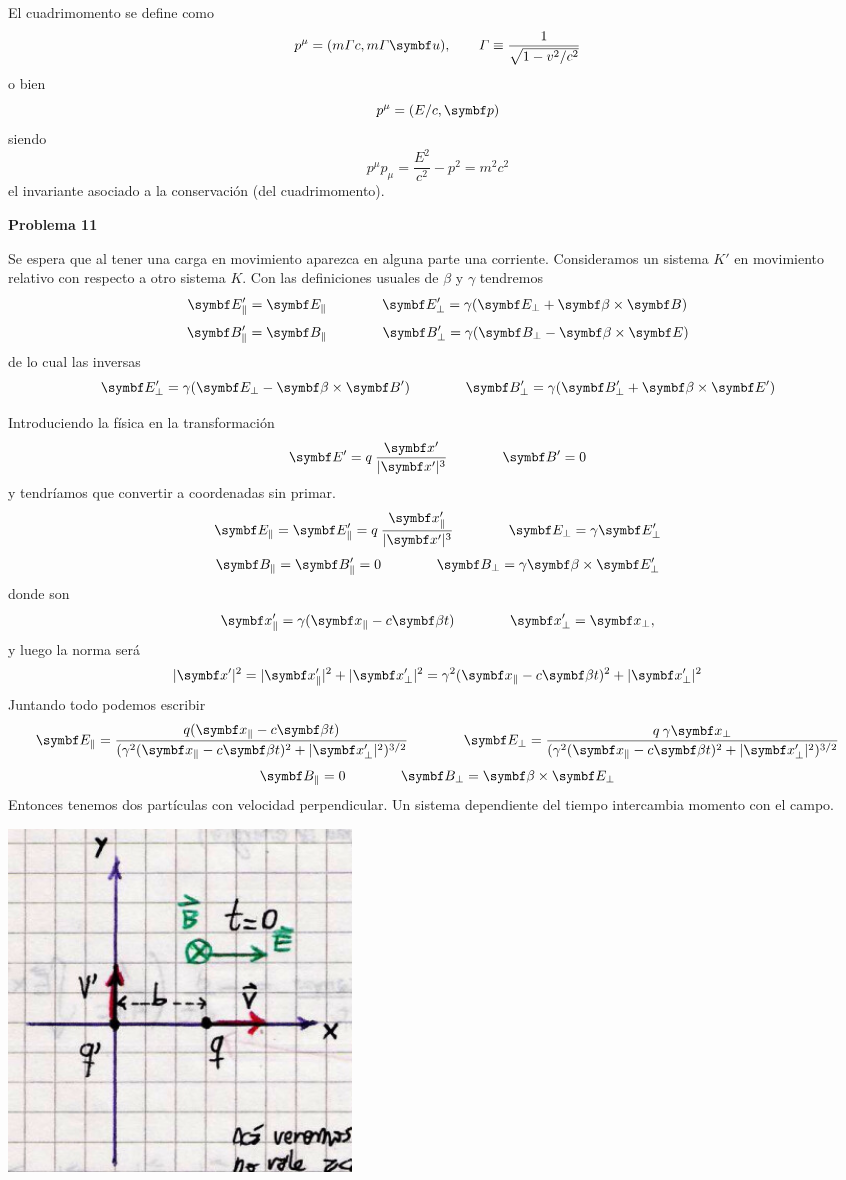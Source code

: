 \documentclass[10pt,oneside]{CBFT_book}
\begin{document}
El cuadrimomento se define como 
\[
	p^\mu = ( m\Gamma c , m \Gamma \vb {u}), \qquad \Gamma \equiv \frac{ 1 }{ \sqrt{ 1 - v^2/c^2 } } 
\]
o bien 
\[
	p^\mu = ( E/c , \vb{p} )
\]
siendo 
\[
	p^\mu p_\mu = \frac{E^2}{c^2} - p^2 = m^2 c^2
\]
el invariante asociado a la conservación (del cuadrimomento).

\begin{ejemplo}{\bf Problema 11}
 
Se espera que al tener una carga en movimiento aparezca en alguna parte una corriente.
Consideramos un sistema $K'$ en movimiento relativo con respecto a otro sistema $K$.
Con las definiciones usuales de $\beta$ y $\gamma$ tendremos
\[
	\vb{E}_\parallel' = \vb{E}_\parallel \qquad \qquad  
	\vb{E}_\perp' = \gamma ( \vb{E}_\perp + \pv{\beta}{B} )
\]
\[
	\vb{B}_\parallel' = \vb{B}_\parallel \qquad \qquad  
	\vb{B}_\perp' = \gamma ( \vb{B}_\perp - \pv{\beta}{E} )
\]
de lo cual las inversas
\[
	\vb{E}_\perp' = \gamma ( \vb{E}_\perp - \pv{\beta}{B}' ) \qquad \qquad 
	\vb{B}_\perp' = \gamma ( \vb{B}_\perp' + \pv{\beta}{E}' )
\]

Introduciendo la física en la transformación
\[
	\vb{E}' = q \: \frac{\vb{x}'}{|\vbx'|^3} \qquad \qquad \vb{B}' = 0
\]
y tendríamos que convertir a coordenadas sin primar.
\[
	\vb{E}_\parallel = \vb{E}_\parallel' =  q \: \frac{\vb{x}_\parallel'}{|\vbx'|^3} 
	\qquad \qquad  \vb{E}_\perp = \gamma \vb{E}_\perp' 
\]
\[
	\vb{B}_\parallel = \vb{B}_\parallel' = 0 \qquad \qquad  
	\vb{B}_\perp = \gamma \pv{\beta}{E}_\perp' 
\] 
donde son
\[
	\vbx_\parallel' = \gamma ( \vbx_\parallel - c \vb{\beta}t ) 
	\qquad \qquad \vbx_\perp' = \vbx_\perp,
\]
y luego la norma será
\[
	|\vbx'|^2 = |\vbx_\parallel'|^2 + |\vbx_\perp'|^2 =
	\gamma^2 ( \vbx_\parallel - c \vb{\beta}t )^2 + |\vbx_\perp'|^2
\]
Juntando todo podemos escribir
\[
	\vb{E}_\parallel = \frac{q ( \vbx_\parallel - c \vb{\beta}t ) }
	{ (\gamma^2 ( \vbx_\parallel - c \vb{\beta}t )^2 + |\vbx_\perp'|^2)^{3/2} } 
	\qquad \qquad  
	\vb{E}_\perp = \frac{ q \: \gamma \vbx_\perp }
	{ (\gamma^2 ( \vbx_\parallel - c \vb{\beta}t )^2 + |\vbx_\perp'|^2)^{3/2} } 
\]
\[
	\vb{B}_\parallel = 0 \qquad \qquad  
	\vb{B}_\perp = \pv{\beta}{E}_\perp 
\] 
Entonces tenemos dos partículas con velocidad perpendicular.
Un sistema dependiente del tiempo intercambia momento con el campo.
 
\includegraphics[width=0.4\textwidth]{images/fig_ft1_speRel_prob11A.jpg} 
 

\end{ejemplo}
\end{document}
